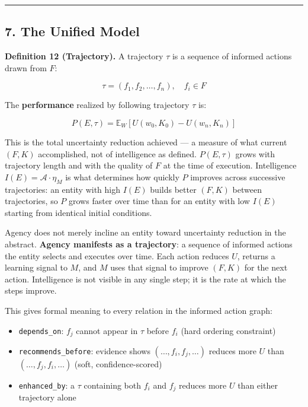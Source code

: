 \documentclass[
]{article}
\providecommand{\tightlist}{%
  \setlength{\itemsep}{0pt}\setlength{\parskip}{0pt}}
\begin{document}
\begin{center}\rule{0.5\linewidth}{0.5pt}\end{center}

\subsection{7. The Unified Model}\label{the-unified-model}

\textbf{Definition 12 (Trajectory).} A trajectory \(\tau\) is a sequence
of informed actions drawn from \(F\):

\[\tau = (f_1, f_2, \ldots, f_n), \quad f_i \in F\]

The \textbf{performance} realized by following trajectory \(\tau\) is:

\[P(E, \tau) = \mathbb{E}_W\left[U(w_0, K_0) - U(w_n, K_n)\right]\]

This is the total uncertainty reduction achieved --- a measure of what
current \((F, K)\) accomplished, not of intelligence as defined.
\(P(E, \tau)\) grows with trajectory length and with the quality of
\(F\) at the time of execution. Intelligence \(I(E) = \mathcal{A}
\cdot \eta_M\) is what determines how quickly \(P\) improves across
successive trajectories: an entity with high \(I(E)\) builds better
\((F, K)\) between trajectories, so \(P\) grows faster over time than
for an entity with low \(I(E)\) starting from identical initial
conditions.

Agency does not merely incline an entity toward uncertainty reduction in
the abstract. \textbf{Agency manifests as a trajectory}: a sequence of
informed actions the entity selects and executes over time. Each action
reduces \(U\), returns a learning signal to \(M\), and \(M\) uses that
signal to improve \((F, K)\) for the next action. Intelligence is not
visible in any single step; it is the rate at which the steps improve.

This gives formal meaning to every relation in the informed action
graph:

\begin{itemize}
\tightlist
\item
  \texttt{depends\_on}: \(f_j\) cannot appear in \(\tau\) before \(f_i\)
  (hard ordering constraint)
\item
  \texttt{recommends\_before}: evidence shows
  \((\ldots, f_i, f_j, \ldots)\) reduces more \(U\) than
  \((\ldots, f_j, f_i, \ldots)\) (soft, confidence-scored)
\item
  \texttt{enhanced\_by}: a \(\tau\) containing both \(f_i\) and \(f_j\)
  reduces more \(U\) than either trajectory alone
\end{itemize}
\end{document}
